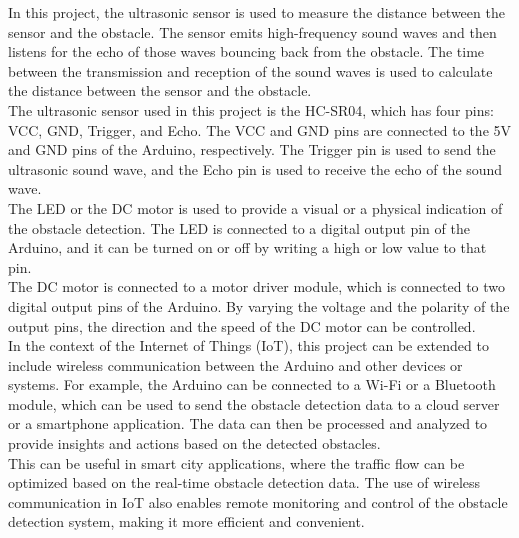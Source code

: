 \documentclass[11pt]{article}
\begin{document}
In this project, the ultrasonic sensor is used to measure the distance between the sensor and the obstacle. The sensor emits high-frequency sound waves and then listens for the echo of those waves bouncing back from the obstacle. The time between the transmission and reception of the sound waves is used to calculate the distance between the sensor and the obstacle.\\

The ultrasonic sensor used in this project is the HC-SR04, which has four pins: VCC, GND, Trigger, and Echo. The VCC and GND pins are connected to the 5V and GND pins of the Arduino, respectively. The Trigger pin is used to send the ultrasonic sound wave, and the Echo pin is used to receive the echo of the sound wave.\\

The LED or the DC motor is used to provide a visual or a physical indication of the obstacle detection. The LED is connected to a digital output pin of the Arduino, and it can be turned on or off by writing a high or low value to that pin. \\

The DC motor is connected to a motor driver module, which is connected to two digital output pins of the Arduino. By varying the voltage and the polarity of the output pins, the direction and the speed of the DC motor can be controlled.\\

In the context of the Internet of Things (IoT), this project can be extended to include wireless communication between the Arduino and other devices or systems. For example, the Arduino can be connected to a Wi-Fi or a Bluetooth module, which can be used to send the obstacle detection data to a cloud server or a smartphone application. The data can then be processed and analyzed to provide insights and actions based on the detected obstacles.\\

This can be useful in smart city applications, where the traffic flow can be optimized based on the real-time obstacle detection data. The use of wireless communication in IoT also enables remote monitoring and control of the obstacle detection system, making it more efficient and convenient.
\end{document}
